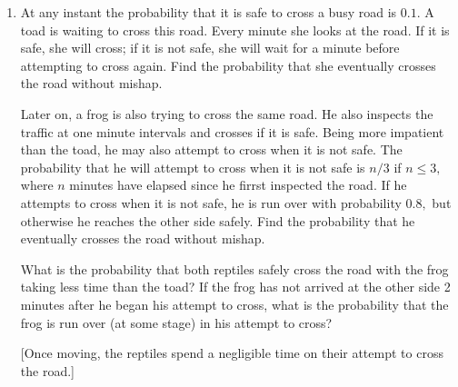 \documentclass[a4, 11pt]{report}
\newlength{\qspace}
\newcounter{qnumber}
\newenvironment{question}%
 {\vspace{\qspace}
  \begin{enumerate}[\bfseries 1\quad][10]%
    \setcounter{enumi}{\value{qnumber}}%
    \item%
 }
{
  \end{enumerate}
  \filbreak
  \stepcounter{qnumber}
 }
\begin{document}
\begin{question}
At any instant the probability that it is safe to cross a busy road
is $0.1$. A toad is waiting to cross this road. Every minute she
looks at the road. If it is safe, she will cross; if it is not safe,
she will wait for a minute before attempting to cross again. Find
the probability that she eventually crosses the road without mishap. 


Later on, a frog is also trying to cross the same road. He also inspects
the traffic at one minute intervals and crosses if it is safe. Being
more impatient than the toad, he may also attempt to cross when it
is not safe. The probability that he will attempt to cross when it
is not safe is $n/3$ if $n\leqslant3,$ where $n$ minutes have elapsed
since he firrst inspected the road. If he attempts to cross when it
is not safe, he is run over with probability $0.8,$ but otherwise
he reaches the other side safely. Find the probability that he eventually
crosses the road without mishap. 


What is the probability that both reptiles safely cross the road with
the frog taking less time than the toad? If the frog has not arrived
at the other side 2 minutes after he began his attempt to cross, what
is the probability that the frog is run over (at some stage) in his
attempt to cross?


{[}Once moving, the reptiles spend a negligible time on their attempt
to cross the road.{]}
\end{question}
\end{document}
